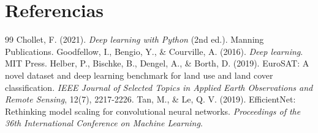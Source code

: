 \documentclass[conference,onecolumn]{IEEEtran}
\begin{document}
\section{Referencias}
\begin{thebibliography}{99}
 Chollet, F. (2021). \textit{Deep learning with Python} (2nd ed.). Manning Publications.
 Goodfellow, I., Bengio, Y., \& Courville, A. (2016). \textit{Deep learning}. MIT Press.
 Helber, P., Bischke, B., Dengel, A., \& Borth, D. (2019). EuroSAT: A novel dataset and deep learning benchmark for land use and land cover classification. \textit{IEEE Journal of Selected Topics in Applied Earth Observations and Remote Sensing}, 12(7), 2217-2226.
 Tan, M., \& Le, Q. V. (2019). EfficientNet: Rethinking model scaling for convolutional neural networks. \textit{Proceedings of the 36th International Conference on Machine Learning}.
\end{thebibliography}
\end{document}
